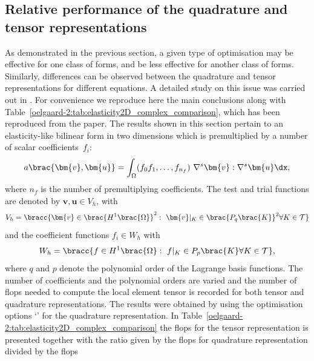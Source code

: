 \subsection{Relative performance of the quadrature and tensor representations}
\label{oelgaard-2:sec:performance_of_representations}
%
As demonstrated in the previous section, a given type of optimisation may
be effective for one class of forms, and be less effective
for another class of forms.
Similarly, differences can be observed between the quadrature and
tensor representations for different equations.
A detailed study on this issue was carried out in \citet{OlgaardWells2010}.
For convenience we reproduce here the main conclusions along with
Table~\ref{oelgaard-2:tab:elasticity2D_complex_comparison}, which has been
reproduced from the paper.
The results shown in this section pertain to an elasticity-like bilinear form
in two dimensions which is premultiplied by a number of scalar
coefficients~$f_{i}$:
%
\begin{equation}
  a\brac{\bm{v}, \bm{u}} = \int_{\Omega} (f_0 f_1, \ldots, f_{n_f} )\
  \nabla^s \bm{v} : \nabla^s \bm{u} \dx,
\label{oelgaard-2:eq:elasticity_form}
\end{equation}
%
where $n_f$ is the number of premultiplying coefficients.
The test and trial functions are denoted by $\bm{v}, \bm{u} \in V_{h}$, with
%
\begin{equation}
  V_{h} = \bracc{\bm{v} \in \brac{H^{1}\brac{\Omega}}^2: \ \bm{v}\vert_K \in \brac{P_{q}\brac{K}}^2
   \forall K \in \mathcal{T}}
\label{oelgaard-2:eq:elastictity_H1_vector_space}
\end{equation}
%
and the coefficient functions $f_{i} \in W_{h}$ with
%
\begin{equation}
  W_{h} = \bracc{f \in H^{1}\brac{\Omega}: \ f\vert_K \in P_{p}\brac{K}
   \forall K \in \mathcal{T}},
\label{oelgaard-2:eq:elasticity_H1_space}
\end{equation}
%
where $q$ and $p$ denote the polynomial order of the Lagrange basis functions.
The number of coefficients and the polynomial orders are varied and the number
of flops needed to compute the local element tensor is recorded for both
tensor and quadrature representations.
The results were obtained by using the optimisation options
`' for the quadrature
representation.
In Table~\ref{oelgaard-2:tab:elasticity2D_complex_comparison}
the flops for the tensor representation is presented together with the
ratio given by the flops for quadrature representation divided by the flops

